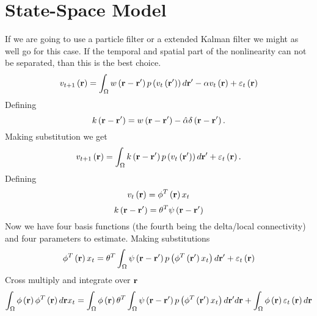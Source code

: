 \documentclass[onecolumn,draftcls]{IEEEtran}
\begin{document}
\section{State-Space Model}
If we are going to use a particle filter or a extended Kalman filter we might as well go for this case. If the temporal and spatial part of the nonlinearity can not be separated, than this is the best choice.
\begin{equation}\label{SystemEq}
{v_{t + 1}}\left( {\bf{r}} \right) = \int_\Omega  {w\left( {{\bf{r}} - {\bf{r'}}} \right)p\left( {{v_t}\left( {{\bf{r'}}} \right)} \right)d{\bf{r'}}}  - \alpha {v_t}\left( {\bf{r}} \right) + {\varepsilon _t}\left( {\bf{r}} \right)
\end{equation}
Defining
\begin{equation}\label{CombiningKernels}
k\left( {{\bf{r}} - {\bf{r'}}} \right) = w\left( {{\bf{r}} - {\bf{r'}}} \right) - \hat{\alpha}\delta \left( {{\bf{r}} - {\bf{r'}}} \right).
\end{equation}
Making substitution we get
\begin{equation}\label{OneKernelModel}
{v_{t + 1}}\left( {\bf{r}} \right) = \int_\Omega  {k\left( {{\bf{r}} - {\bf{r'}}} \right)p\left( {{v_t}\left( {{\bf{r'}}} \right)} \right)d{\bf{r'}}}  + {\varepsilon _t}\left( {\bf{r}} \right).
\end{equation}
Defining
\begin{equation}\label{DefFieldDecomp}
{v_t}\left( {\bf{r}} \right) = {\phi ^T}\left( {\bf{r}} \right){x_t}
\end{equation}
\begin{equation}\label{DefKernelDecomp}
k\left( {{\bf{r}} - {\bf{r'}}} \right) = {\theta ^T}\psi \left( {{\bf{r}} - {\bf{r'}}} \right)
\end{equation}
Now we have four basis functions (the fourth being the delta/local connectivity) and four parameters to estimate. Making substitutions
\begin{equation}\label{DecompModel}
{\phi ^T}\left( {\bf{r}} \right){x_t} = {\theta ^T}\int_\Omega  {\psi \left( {{\bf{r}} - {\bf{r'}}} \right)p\left( {{\phi ^T}\left( {{\bf{r'}}} \right){x_t}} \right)d{\bf{r'}}}  + {\varepsilon _t}\left( {\bf{r}} \right)
\end{equation}
Cross multiply and integrate over $\bf{r}$
\begin{equation}\label{Poo}
\int_\Omega  {\phi \left( {\bf{r}} \right){\phi ^T}\left( {\bf{r}} \right)d{\bf{r}}{x_t}}  = \int_\Omega  {\phi \left( {\bf{r}} \right){\theta ^T}\int_\Omega  {\psi \left( {{\bf{r}} - {\bf{r'}}} \right)p\left( {{\phi ^T}\left( {{\bf{r'}}} \right){x_t}} \right)d{\bf{r'}}} d{\bf{r}}}  + \int_\Omega  {\phi \left( {\bf{r}} \right){\varepsilon _t}\left( {\bf{r}} \right)d{\bf{r}}}
\end{equation}
\end{document}
